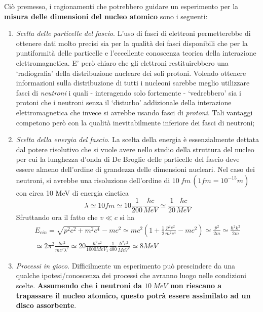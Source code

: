 Ciò premesso, i ragionamenti che potrebbero guidare un esperimento per
la \textbf{misura delle dimensioni del nucleo atomico} sono i seguenti:
\begin{enumerate}
	\tightlist
	\item
	\emph{Scelta delle particelle del fascio}. L'uso di fasci di elettroni
	permetterebbe di ottenere dati molto precisi sia per la qualità dei
	fasci disponibili che per la puntiformità delle particelle e
	l'eccellente conoscenza teorica della interazione elettromagnetica. E'
	però chiaro che gli elettroni restituirebbero una `radiografia' della
	distribuzione nucleare dei soli protoni. Volendo ottenere informazioni
	sulla distribuzione di tutti i nucleoni sarebbe meglio utilizzare
	fasci di \emph{neutroni} i quali - interagendo solo fortemente -
	`vedrebbero' sia i protoni che i neutroni senza il `disturbo'
	addizionale della interazione elettromagnetica che invece si avrebbe
	usando fasci di \emph{protoni}. Tali vantaggi competono però con la
	qualità inevitabilmente inferiore dei fasci di neutroni;
	\item
	\emph{Scelta della energia del fascio}. La scelta della energia è
	essenzialmente dettata dal potere risolutivo che si vuole avere nello
	studio della struttura del nucleo per cui la lunghezza d'onda di De
	Broglie delle particelle del fascio deve essere almeno dell'ordine di
	grandezza delle dimensioni nucleari. Nel caso dei neutroni, si avrebbe
	una risoluzione dell'ordine di \(10 \  fm \,(1 fm=10^{-15} m)\) con
	circa 10 MeV di energia cinetica
	\[
		\lambda \simeq 10 fm \simeq 10 \frac{1}{200} \frac{\hbar c}{MeV} \simeq \frac{1}{20} \frac{\hbar  c}{MeV}
	\]
	Sfruttando ora il fatto che $v \ll c$ si ha
	\begin{gather*}
	    E_{cin} = \sqrt{ p^{2}c^{2}+m^{2}c^4 } - mc^{2} \simeq mc^{2} \left(1 + \frac{1}{2} \frac{{p^{2}c^{2}}}{m^{2}c^4}- mc^{2}\right) \simeq \frac{p^{2}}{2m} \simeq \frac{\hbar^{2}k^{2}}{2m}\\
	    \simeq 2\pi^{2} \frac{\hbar c^{2}}{mc^{2}\lambda^{2}} \simeq 20 \frac{\hbar^{2} c^{2} }{1000MeV_{1}} \frac{1}{400} \frac{\hbar^{2} c^{2}}{MeV^2} \simeq 8 MeV
	\end{gather*}
	\item
	\emph{Processi in gioco}. Difficilmente un esperimento può prescindere
	da una qualche ipotesi/conoscenza dei processi che avranno luogo nelle
	condizioni scelte. \textbf{Assumendo che i neutroni da \(10 \ MeV\) non
	riescano a trapassare il nucleo atomico, questo potrà essere
	assimilato ad un disco assorbente}.
\end{enumerate}


